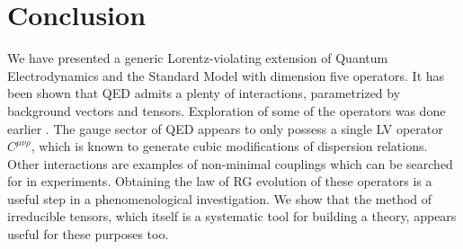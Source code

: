 \documentclass[12pt,preprintnumbers,nofootinbib]{revtex4}
\newcommand{\wt}{\widetilde}
\newcommand{\ov}{\overline}
\begin{document}
	

%
%
\section{Conclusion}
	We have presented a generic Lorentz-violating extension of 
	Quantum Electrodynamics and the Standard Model with dimension five operators.
	It has been shown that QED admits a plenty of interactions,
	parametrized by background vectors and tensors.
	Exploration of some of the operators was done earlier
\cite{MP:,Gagnon:2004xh}.
	The gauge sector of QED appears to only possess a single LV
	operator $ C^{\mu\nu\rho} $, which is known to generate cubic
	modifications of dispersion relations.	
	Other interactions are examples of non-minimal couplings which can
	be searched for in experiments.
	Obtaining the law of RG evolution of these operators is a useful step in a 
	phenomenological investigation.
	We show that the method of irreducible tensors, which itself is a systematic
	tool for building a theory, appears useful for these purposes too.
\end{document}
